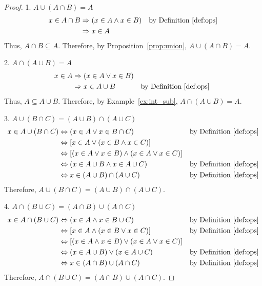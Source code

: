 \documentclass[../main.tex]{subfiles}
\begin{document}
\begin{proof}
    1. $A \cup (A \cap B) = A$
    \begin{align*}
        x \in A \cap B &\Rightarrow (x \in A \wedge x \in B) &\text{by Definition~\ref{def:ops}}\\
                       &\Rightarrow x \in A
    \end{align*}
    Thus, $A \cap B \subseteq A$.
    Therefore, by Proposition~\ref{prop:union}, $A \cup (A \cap B) = A$.

    2. $A \cap (A \cup B) = A$
    \begin{align*}
        x \in A &\Rightarrow (x \in A \vee x \in B) \\
                &\Rightarrow x \in A \cup B &\text{by Definition~\ref{def:ops}}\
    \end{align*}
    Thus, $A \subseteq A \cup B$.
    Therefore, by Example~\ref{ex:int_sub}, $A \cap (A \cup B) = A$.

    3. $A \cup (B \cap C) = (A \cup B) \cap (A \cup C)$
    \begin{align*}
        x \in A \cup (B \cap C) &\Leftrightarrow (x \in A \vee x \in B \cap C) &\text{by Definition~\ref{def:ops}}\\
                                &\Leftrightarrow [x \in A \vee (x \in B \wedge x \in C)]\\
                                &\Leftrightarrow [(x \in A \vee x \in B) \wedge (x \in A \vee x \in C)]\\
                                &\Leftrightarrow (x \in A \cup B \wedge x \in A \cup C) &\text{by Definition~\ref{def:ops}}\\
                                &\Leftrightarrow x \in (A\cup B) \cap (A \cup C) &\text{by Definition~\ref{def:ops}}
    \end{align*}
    Therefore, $A \cup (B \cap C) = (A \cup B) \cap (A \cup C)$.

    4. $A \cap (B \cup C) = (A \cap B) \cup (A \cap C)$
    \begin{align*}
        x \in A \cap (B \cup C) &\Leftrightarrow (x \in A \wedge x \in B \cup C) &\text{by Definition~\ref{def:ops}}\\
                                &\Leftrightarrow [x \in A \wedge (x \in B \vee x \in C)] &\text{by Definition~\ref{def:ops}}\\
                                &\Leftrightarrow [(x \in A \wedge x \in B) \vee (x \in A \vee x \in C)]\\
                                &\Leftrightarrow (x \in A \cup B) \vee (x \in A \cup C) &\text{by Definition~\ref{def:ops}}\\
                                &\Leftrightarrow x \in (A \cap B) \cup (A \cap C) &\text{by Definition~\ref{def:ops}}
    \end{align*}
    Therefore, $A \cap (B \cup C) = (A \cap B) \cup (A \cap C)$.
\end{proof}
\end{document}

